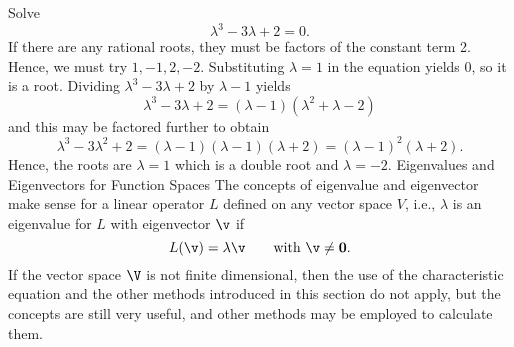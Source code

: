 \nextex
\xdef\ExBB{\en}
Solve 
$$
\lambda^3 -3\lambda  + 2 = 0.
$$
If there are any rational roots, they must be factors of the
constant term 2.  Hence, we must try $1, -1, 2, -2$.  Substituting
$\lambda = 1$ in the equation yields 0, so it is a root.
Dividing $\lambda^3 - 3\lambda + 2$ by $\lambda - 1$ yields
$$
\lambda^3 - 3\lambda + 2 = (\lambda - 1)(\lambda^2 + \lambda -2)
$$
and this may be factored further to obtain
$$\lambda^3 - 3\lambda^2 + 2 = (\lambda - 1)(\lambda -1)(\lambda + 2)
 = (\lambda - 1)^2(\lambda + 2).
$$
Hence, the roots are $\lambda = 1$ which is a double root and
$\lambda = -2$.
\medskip
\subhead Eigenvalues and Eigenvectors for Function Spaces \endsubhead
The concepts of eigenvalue and eigenvector make sense for
a linear operator $L$ defined on any vector space $V$, i.e.,
$\lambda$ is an eigenvalue for $L$ with eigenvector $\v$
if
$$
L(\v) = \lambda \v\qquad\text{with } \v \not= \bold 0.
$$
If the vector space $\V$ is not finite dimensional, then the
use of the characteristic equation and the other methods introduced
in this section do not apply, but the concepts are still very
useful, and other methods may be employed to calculate them.


